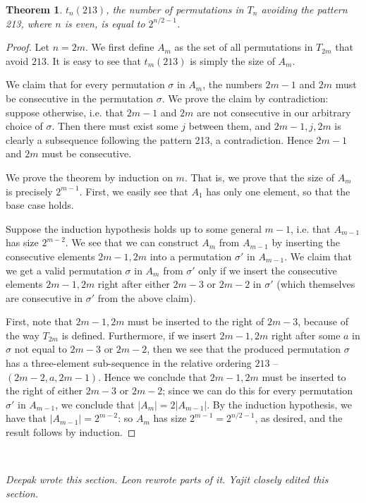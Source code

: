 \documentclass[11pt,letterpaper,twoside,english]{article}
\theoremstyle{theorem}
\newtheorem{theorem}{Theorem}[section]
\theoremstyle{remark}
\begin{document}
\begin{theorem}
$t_n(213)$, the number of permutations in $T_n$ avoiding the pattern 213, where $n$ is even, is equal to $2^{n/2-1}$.
\end{theorem}

\begin{proof}
Let $n=2m$. We first define $A_m$ as the set of all permutations in $T_{2m}$ that avoid $213$. It is easy to see that $t_m(213)$ is simply the size of $A_m$.

We claim that for every permutation $\sigma$ in $A_m$, the numbers $2m-1$ and $2m$ must be consecutive in the permutation $\sigma$. We prove the claim by contradiction: suppose otherwise, i.e. that $2m-1$ and $2m$ are not consecutive in our arbitrary choice of $\sigma$. Then there must exist some $j$ between them, and $2m-1, j, 2m$ is clearly a subsequence following the pattern 213, a contradiction. Hence $2m-1$ and $2m$ must be consecutive.

We prove the theorem by induction on $m$. That is, we prove that the size of $A_m$ is precisely $2^{m-1}$. First, we easily see that $A_1$ has only one element, so that the base case holds.

Suppose the induction hypothesis holds up to some general $m-1$, i.e. that $A_{m-1}$ has size $2^{m-2}$. We see that we can construct $A_m$ from $A_{m-1}$ by inserting the consecutive elements $2m-1, 2m$ into a permutation $\sigma'$ in $A_{m-1}$. We claim that we get a valid permutation $\sigma$ in $A_m$ from $\sigma'$ only if we insert the consecutive elements $2m-1, 2m$ right after either $2m-3$ or $2m-2$ in $\sigma'$ (which themselves are consecutive in $\sigma'$ from the above claim).

First, note that $2m-1, 2m$ must be inserted to the right of  $2m-3$, because of the way $T_{2m}$ is defined. Furthermore, if we insert $2m-1, 2m$ right after some $a$ in $\sigma$ not equal to $2m-3$ or $2m-2$, then we see that the produced permutation $\sigma$ has a three-element sub-sequence in the relative ordering $213$ -- $(2m-2, a, 2m-1)$. Hence we conclude that $2m-1, 2m$ must be inserted to the right of either $2m-3$ or $2m-2$; since we can do this for every permutation $\sigma'$ in $A_{m-1}$, we conclude that $|A_m| = 2|A_{m-1}|$. By the induction hypothesis, we have that $|A_{m-1}|=2^{m-2}$: so $A_m$ has size $2^{m-1} = 2^{n/2 - 1}$, as desired, and the result follows by induction.
\end{proof}

\

\emph{Deepak wrote this section. Leon rewrote parts of it. Yajit closely edited this section.}
\end{document}
